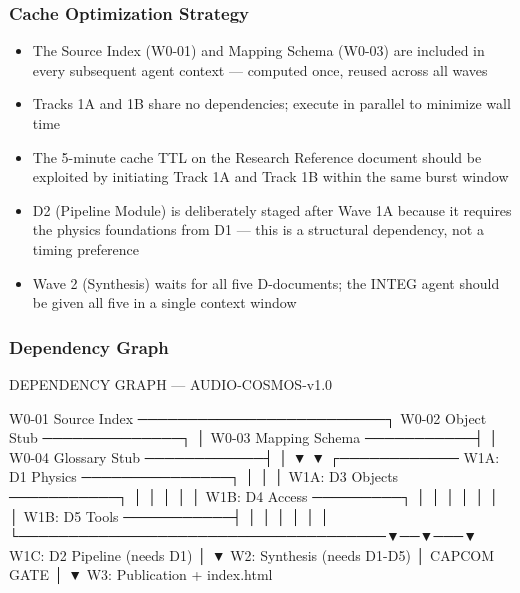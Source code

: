 \documentclass[11pt,letterpaper]{article}
\begin{document}
\subsubsection{Cache Optimization Strategy}

\begin{itemize}
  \item The Source Index (W0-01) and Mapping Schema (W0-03) are included in every subsequent agent context — computed once, reused across all waves
  \item Tracks 1A and 1B share no dependencies; execute in parallel to minimize wall time
  \item The 5-minute cache TTL on the Research Reference document should be exploited by initiating Track 1A and Track 1B within the same burst window
  \item D2 (Pipeline Module) is deliberately staged after Wave 1A because it requires the physics foundations from D1 — this is a structural dependency, not a timing preference
  \item Wave 2 (Synthesis) waits for all five D-documents; the INTEG agent should be given all five in a single context window
\end{itemize}

\subsubsection{Dependency Graph}

\begin{asciibox}
DEPENDENCY GRAPH — AUDIO-COSMOS-v1.0

  W0-01 Source Index ─────────────────────────┐
  W0-02 Object Stub ──────────────┐            │
  W0-03 Mapping Schema ───────────┤            │
  W0-04 Glossary Stub ────────────┤            │
                                  ▼            ▼
             ┌──────────── W1A: D1 Physics ───────────────┐
             │                                             │
             │             W1A: D3 Objects ───────────┐   │
             │                                         │   │
             │             W1B: D4 Access ─────────┐  │   │
             │                                      │  │   │
             │             W1B: D5 Tools ───────────┤  │   │
             │                                      │  │   │
             └─────────────────────────────────────▼──▼───▼
                         W1C: D2 Pipeline (needs D1)
                                    │
                                    ▼
                           W2: Synthesis (needs D1-D5)
                                    │
                             CAPCOM GATE
                                    │
                                    ▼
                          W3: Publication + index.html
\end{asciibox}
\end{document}
